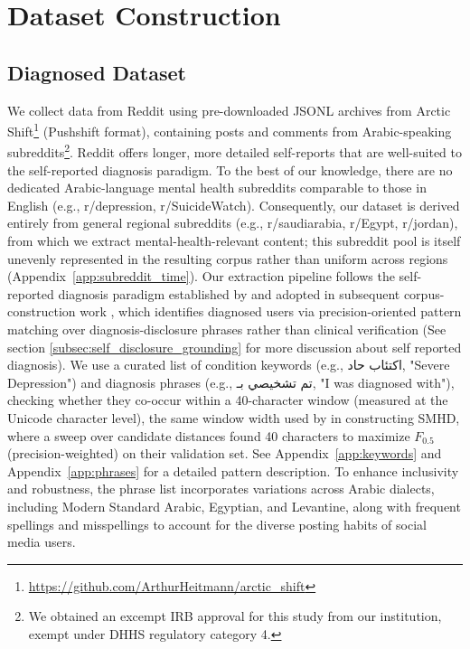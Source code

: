 \documentclass[letterpaper]{article} %
\begin{document}
\section{Dataset Construction}
\label{subsec:data_source}

\subsection{Diagnosed Dataset}

We collect data from Reddit using pre-downloaded JSONL archives from Arctic Shift\footnote{\url{https://github.com/ArthurHeitmann/arctic_shift}} (Pushshift format), containing posts and comments from Arabic-speaking subreddits\footnote{We obtained an excempt IRB approval for this study from our institution, exempt under DHHS regulatory category 4. }. Reddit offers longer, more detailed self-reports that are well-suited to the self-reported diagnosis paradigm. To the best of our knowledge, there are no dedicated Arabic-language mental health subreddits comparable to those in English (e.g., r/depression, r/SuicideWatch). Consequently, our dataset is derived entirely from general regional subreddits (e.g., r/saudiarabia, r/Egypt, r/jordan), from which we extract mental-health-relevant content; this subreddit pool is itself unevenly represented in the resulting corpus rather than uniform across regions (Appendix~\ref{app:subreddit_time}).
Our extraction pipeline follows the self-reported diagnosis paradigm established by \citet{coppersmith2014quantifying} and adopted in subsequent corpus-construction work \citep{coppersmith2015clpsych, cohan-etal-2018-smhd}, which identifies diagnosed users via precision-oriented pattern matching over diagnosis-disclosure phrases rather than clinical verification (See section \ref{subsec:self_disclosure_grounding} for more discussion about self reported diagnosis).
We use a curated list of condition keywords (e.g., \foreignlanguage{arabic}{اكتئاب حاد}, "Severe Depression") and diagnosis phrases (e.g., \foreignlanguage{arabic}{تم تشخيصي بـ}, "I was diagnosed with"), checking whether they co-occur within a 40-character window (measured at the Unicode character level), the same window width used by \citet{cohan-etal-2018-smhd} in constructing SMHD, where a sweep over candidate distances found 40 characters to maximize $F_{0.5}$ (precision-weighted) on their validation set. See Appendix~\ref{app:keywords} and Appendix~\ref{app:phrases} for a detailed pattern description. To enhance inclusivity and robustness, the phrase list incorporates variations across Arabic dialects, including Modern Standard Arabic, Egyptian, and Levantine, along with frequent spellings and misspellings to account for the diverse posting habits of social media users.
\end{document}
